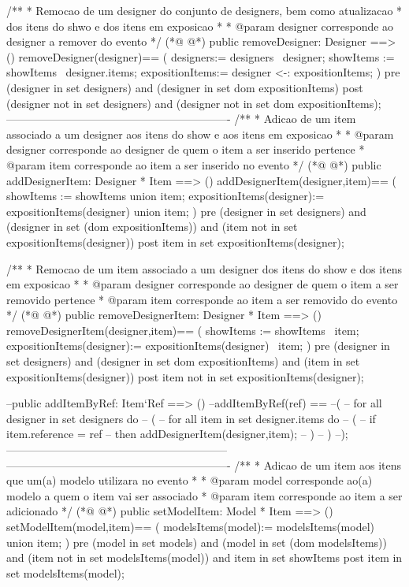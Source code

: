 \begin{vdmpp}[breaklines=true]
 /**
 * Remocao de um designer do conjunto de designers, bem como atualizacao
 * dos itens do shwo e dos itens em exposicao
 * 
 * @param designer corresponde ao designer a remover do evento
 */
(*@
\label{removeDesigner:167}
@*)
 public removeDesigner: Designer ==> ()
 removeDesigner(designer)==
 (
  designers:= designers \ {designer};
  showItems := showItems \ designer.items;
  expositionItems:= {designer} <-: expositionItems;
 )
 pre (designer  in set designers) and
   (designer  in set dom expositionItems) 
 post (designer not in set designers) and
    (designer not in set dom expositionItems);
-------------------------------------------------------------    
 /**
 * Adicao de um item associado a um designer aos itens do show e aos itens em exposicao
 * 
 * @param designer corresponde ao designer de quem o item a ser inserido pertence
 * @param item corresponde ao item a ser inserido no evento
 */
(*@
\label{addDesignerItem:185}
@*)
 public addDesignerItem: Designer * Item ==> ()
 addDesignerItem(designer,item)==
 (
   showItems := showItems union {item};
   expositionItems(designer):= expositionItems(designer) union {item};
 )
 pre (designer in set designers) and
   (designer in set (dom expositionItems)) and
   (item not in set expositionItems(designer))
 post item in set expositionItems(designer);
 
 /**
 * Remocao de um item associado a um designer dos itens do show e dos itens em exposicao
 * 
 * @param designer corresponde ao designer de quem o item a ser removido pertence
 * @param item corresponde ao item a ser removido do evento
 */
(*@
\label{removeDesignerItem:202}
@*)
 public removeDesignerItem: Designer * Item ==> ()
 removeDesignerItem(designer,item)==
 (
  showItems := showItems \ {item};
  expositionItems(designer):= expositionItems(designer) \ {item};
 )
 pre (designer in set designers) and
   (designer in set dom expositionItems) and
   (item in set expositionItems(designer))
 post item not in set expositionItems(designer);
 
 --public addItemByRef: Item`Ref ==> ()
 --addItemByRef(ref) ==
 --(
 -- for all designer in set designers do
 -- (
 --  for all item in set designer.items do
 --  (
 --   if item.reference = ref 
 --   then addDesignerItem(designer,item);
 --  )
 -- )
 --);
------------------------------------------------------------
------------------------------------------------------------- 
 /**
 * Adicao de um item aos itens que um(a) modelo utilizara no evento
 * 
 * @param model corresponde ao(a) modelo a quem o item vai ser associado
 * @param item corresponde ao item a ser adicionado
 */   
(*@
\label{setModelItem:233}
@*)
 public setModelItem: Model * Item ==> ()
 setModelItem(model,item)==
 (
   modelsItems(model):= modelsItems(model) union {item};
 )
 pre (model in set models) and
   (model in set (dom modelsItems)) and
   (item not in set modelsItems(model)) and
   item in set showItems
 post item in set modelsItems(model);
 

\end{vdmpp}
